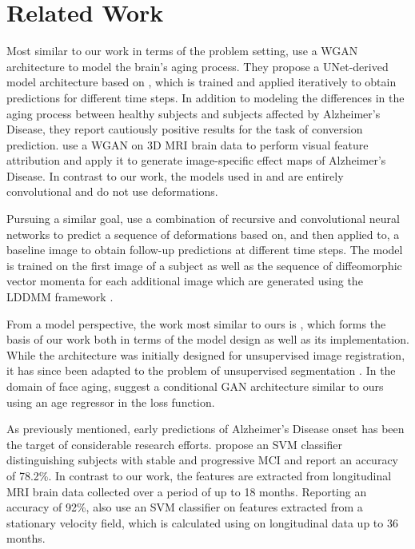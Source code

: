 \section{Related Work}
Most similar to our work in terms of the problem setting, \cite{wegmayr2019generative} use a WGAN architecture to model the brain's aging process. They propose a UNet-derived model architecture based on \cite{baumgartner2018visual}, which is trained and applied iteratively to obtain predictions for different time steps. In addition to modeling the differences in the aging process between healthy subjects and subjects affected by Alzheimer's Disease, they report cautiously positive results for the task of conversion prediction.
\cite{baumgartner2018visual} use a WGAN on 3D MRI brain data to perform visual feature attribution and apply it to generate image-specific effect maps of Alzheimer's Disease.
In contrast to our work, the models used in \cite{wegmayr2019generative} and \cite{baumgartner2018visual} are entirely convolutional and do not use deformations.

Pursuing a similar goal, \cite{pathan2018predictive} use a combination of recursive and convolutional neural networks to predict a sequence of deformations based on, and then applied to, a baseline image to obtain follow-up predictions at different time steps. The model is trained on the first image of a subject as well as the sequence of diffeomorphic vector momenta for each additional image which are generated using the LDDMM framework \cite{beg2005computing}.

From a model perspective, the work most similar to ours is \cite{balakrishnan2019voxelmorph} \cite{dalca2018unsupervised}, which forms the basis of our work both in terms of the model design as well as its implementation. While the architecture was initially designed for unsupervised image registration, it has since been adapted to the problem of unsupervised segmentation \cite{dalca2019unsupervised}.
In the domain of face aging, \cite{palsson2018generative} suggest a conditional GAN \cite{mirza2014conditional} architecture similar to ours using an age regressor in the loss function.

As previously mentioned, early predictions of Alzheimer's Disease onset has been the target of considerable research efforts. \cite{thung2016identification} propose an SVM classifier distinguishing subjects with stable and progressive MCI and report an accuracy of 78.2\%. In contrast to our work, the features are extracted from longitudinal MRI brain data collected over a period of up to 18 months.
Reporting an accuracy of 92\%, \cite{sun2017detection} also use an SVM classifier on features extracted from a stationary velocity field, which is calculated using \cite{vercauteren2009diffeomorphic} on longitudinal data up to 36 months.


